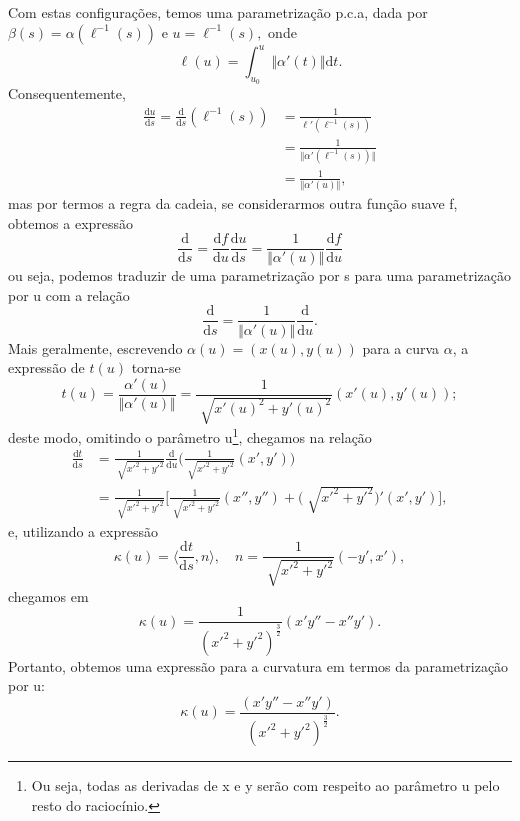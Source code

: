 \documentclass[../differential_geometry.tex]{subfiles}
\begin{document}
Com estas configurações, temos uma parametrização p.c.a, dada por \(\beta (s)=\alpha (\ell^{-1}(s))\) e \(u = \ell^{-1}(s),\) onde
\[
	\ell (u) = \int_{u_{0}}^{u}\Vert \alpha'(t) \Vert \mathrm{d}t.
\]
Consequentemente,
\begin{align*}
	\frac{\mathrm{d}u}{\mathrm{d}s} = \frac{\mathrm{d}}{\mathrm{d}s}(\ell^{-1}(s)) & = \frac{1}{\ell'(\ell ^{-1}(s))}              \\
	                                                                               & = \frac{1}{\Vert \alpha'(\ell^{-1}(s)) \Vert} \\
	                                                                               & = \frac{1}{\Vert \alpha'(u) \Vert},
\end{align*}
mas por termos a regra da cadeia, se considerarmos outra função suave f, obtemos a expressão
\[
	\frac{\mathrm{d}}{\mathrm{d}s}= \frac{\mathrm{d}f}{\mathrm{d}u}\frac{\mathrm{d}u}{\mathrm{d}s}=\frac{1}{\Vert \alpha '(u) \Vert}\frac{\mathrm{d}f}{\mathrm{d}u}
\]
ou seja, podemos traduzir de uma parametrização por s para uma parametrização por u com a relação
\[
	\boxed{\frac{\mathrm{d}}{\mathrm{d}s} = \frac{1}{\Vert \alpha '(u) \Vert}\frac{\mathrm{d}}{\mathrm{d}u}}.
\]
Mais geralmente, escrevendo \(\alpha (u)=(x(u), y(u))\) para a curva \(\alpha \), a expressão de \(t(u)\) torna-se
\[
	t(u) = \frac{\alpha'(u)}{\Vert \alpha'(u) \Vert}=\frac{1}{\sqrt[]{x'(u)^{2}+y'(u)^{2}}}(x'(u), y'(u));
\]
deste modo, omitindo o parâmetro u\footnote{Ou seja, todas as derivadas de x e y serão com respeito ao parâmetro u pelo resto do raciocínio.}, chegamos na relação
\begin{align*}
	\frac{\mathrm{d}t}{\mathrm{d}s} & = \frac{1}{\sqrt[]{x'^{2}+y'^{2}}}\frac{\mathrm{d}}{\mathrm{d}u}\biggl(\frac{1}{\sqrt[]{x'^{2}+y'^{2}}}(x', y')\biggr)                      \\
	                                & = \frac{1}{\sqrt[]{x'^{2}+y'^{2}}}\biggl[\frac{1}{\sqrt[]{x'^{2}+y'^{2}}}(x'', y'') + \biggl(\sqrt[]{x'^{2}+y'^{2}}\biggr)'(x', y')\biggr],
\end{align*}
e, utilizando a expressão
\[
	\kappa (u) = \biggl\langle \frac{\mathrm{d}t}{\mathrm{d}s}, n \biggr\rangle, \quad n = \frac{1}{\sqrt[]{x'^{2}+y'^{2}}}(-y', x'),
\]
chegamos em
\[
	\kappa (u) = \frac{1}{(x'^{2}+y'^{2})^{\frac{3}{2}}}(x'y''-x''y').
\]
Portanto, obtemos uma expressão para a curvatura em termos da parametrização por u:
\[
	\kappa (u) = \frac{(x'y''-x''y')}{(x'^{2}+y'^{2})^{\frac{3}{2}}}.
\]
\end{document}

